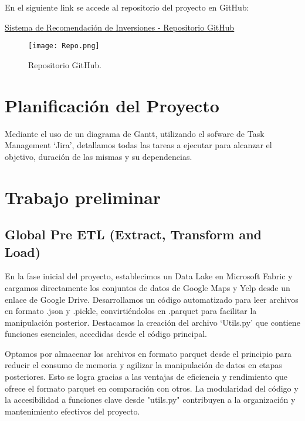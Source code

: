 \documentclass[12pt]{article}
\begin{document}
En el siguiente link se accede al repositorio del proyecto en GitHub:

\href{https://github.com/leocortes85/Invesment_Recomendation_Project}{Sistema de Recomendación de Inversiones - Repositorio GitHub}

\begin{figure}[H]
  \centering
  \texttt{[image: Repo.png]}
  \caption{Repositorio GitHub.}
  \label{fig:Repositorio GitHub}
\end{figure}

\section{Planificación del Proyecto}

Mediante el uso de un diagrama de Gantt, utilizando el sofware de Task Management `Jira', 
 detallamos todas las tareas a ejecutar para alcanzar el objetivo, duración de las mismas y su dependencias.



\section{Trabajo preliminar}
\subsection{Global Pre ETL (Extract, Transform and Load)}
En la fase inicial del proyecto, establecimos un Data Lake en Microsoft Fabric y cargamos directamente los conjuntos de datos de Google Maps y Yelp desde un enlace de Google Drive. Desarrollamos un código automatizado para leer archivos en formato .json y .pickle, convirtiéndolos en .parquet para facilitar la manipulación posterior. Destacamos la creación del archivo `Utils.py' que contiene funciones esenciales, accedidas desde el código principal.

Optamos por almacenar los archivos en formato parquet desde el principio para reducir el consumo de memoria y agilizar la manipulación de datos en etapas posteriores. Esto se logra gracias a las ventajas de eficiencia y rendimiento que ofrece el formato parquet en comparación con otros. La modularidad del código y la accesibilidad a funciones clave desde "utils.py" contribuyen a la organización y mantenimiento efectivos del proyecto.
\end{document}
